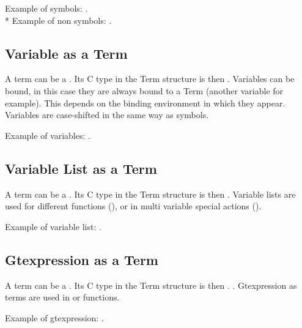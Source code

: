Example of symbols: .\\*
Example of non symbols: .

\subsection{Variable as a Term}


A term can be a . Its C type in the Term structure is then
. Variables can be bound, in this case they are always bound to
a Term (another variable for example). This depends on the binding environment
in which they appear. Variables are case-shifted in the same way as symbols.


Example of variables: .

\subsection{Variable List as a Term}

A term can be a . Its C type in the Term structure is then
. Variable lists are used for different functions
(), or in 
multi variable special actions ().

Example of variable list: .

\subsection{Gtexpression as a Term}

A term can be a . Its C type in the Term
structure is then . . Gtexpression as terms are used in 
or  functions.

Example of gtexpression: .


